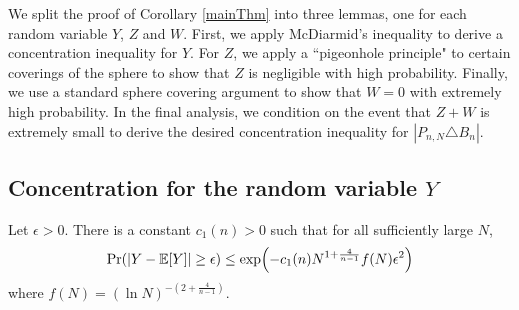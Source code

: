 We split the proof of Corollary \ref{mainThm} into three lemmas, one for each random variable $Y$, $Z$ and $W$. First, we apply McDiarmid's inequality %
to  derive a concentration inequality for $Y$. For $Z$, we apply %
a ``pigeonhole principle" to certain  coverings of the sphere to show that $Z$ is negligible with high probability. Finally, we use a standard sphere covering argument to show that $W=0$ with extremely high probability. In the final analysis, we condition on the event that $Z+W$ is extremely small to derive the desired concentration inequality for $| P_{n,N} \triangle B_n|$. 


\subsection{Concentration for the random variable $Y$}

\begin{lemma}\label{Yprop}
	Let $\epsilon>0$. There is a constant $c_1(n)>0$ such that for all sufficiently large $N$,
	\[
	\Pr(|Y-\E[Y]| \geq \epsilon) \leq
	\exp\left(-c_1(n)N^{1+\frac{4}{n-1}}f(N)\epsilon^2\right)
	\]
	where $f(N)=(\ln N)^{-(2+\frac{4}{n-1})}$.
\end{lemma}

